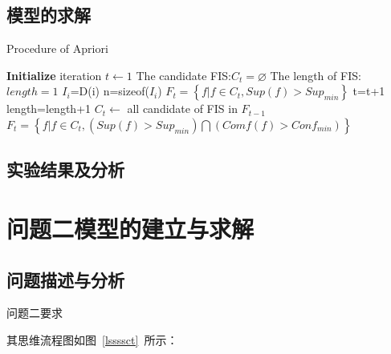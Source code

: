 \documentclass{whutmod}
\begin{document}
		\subsection{模型的求解}
			\begin{algorithm}[H]
			 	\caption{Procedure of Apriori}  
			 	\LinesNumbered  
			 	\textbf{Initialize} \newline
			 	iteration $t\leftarrow 1$ \newline
			 	The candidate FIS:$C_{t}=\varnothing$ \newline
			 	The length of FIS:$length=1$ \newline
			 	{$I_{i}$=D(i)\newline
			 		n=sizeof($I_{i}$)\newline
			 	}
			 	$F_{t}=\left \{ f|f\in C_{t},Sup(f)>Sup_{min}\right \}$\newline
			 	{ t=t+1\newline 
			 		length=length+1\newline	
			 		$C_{t}\leftarrow $ all candidate of FIS in $F_{t-1}$\newline
			 		$F_{t}=\left \{ f|f\in C_{t},(Sup(f)>Sup_{min})\bigcap (Comf(f)>Conf_{min}) \right\}$\newline
			 	}	
			\end{algorithm} 
		
        \subsection{实验结果及分析}
  
	\section{问题二模型的建立与求解}
		\subsection{问题描述与分析}
			问题二要求

    		其思维流程图如图~\ref{lssssct}~所示：
\end{document}
